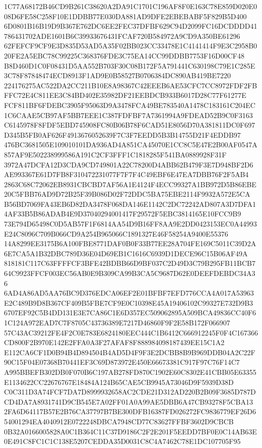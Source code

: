 \documentclass[UTF8,fontset=fandol,zihao=-4,a4paper]{ctexart}
\begin{document}
{{1C77A68172B46CD9B261C38620A2DA91C1701C196AF8F0E163C78E859D020E008D6FE58C258F10E1DDBB77E030DA881AD9DFE2EBEBABF5F829B5D400
6D0801B16B19D9B367E762DC6EE2FEC37DFBF629C94D2099FC16DCDDDD41786431702ADE1601B6C39933676431FCAF720B584972A9CD9A350BE61296
62FEFCF9CF9E3D835D53AD5A35F02BB023CC33478E1C4141414F9E3C2958B020FE2A5EBC78C99225C368376FDE3C75EA14CC99DDBB7753F16D00CF48
B8D460D1C0F08431D5AA552B703F30C08B172F5A791441C630198C79E1C285E3C78F87848474ECD8913F1AD9E0B58527B0706384DC890AB419BE7220
224176275AC522DA2CC211B10E8A98367C42EEEB6AE53CFC7CC8972FDF2FBFFC72E4C811EE3C84BD402E35982DF21EEBDCB933B6017D28C77F61277E
FCF811BF6FDEBC3905F95063D9A3478FCA49BE783540A1478C183161C204EC1C6CAAE5CB97AF5BB7EEE1C387FDFBF7A7361994A9FDEAD52B9C0F3163
C6145978F8FDF5EBD745908FC80B06B78F6CAD51E8056D70A381811DC0F697D345B5FB0AF626F4913676052639F7C3F7EEDD5B3B14755D21F4EDDB97
476BC3681505E109010101DA936AD4A851CA45070E1CC8C5E47E2B00AF0547A857AF9E502238999586A191C2CF3FFF1C1818285F541BA0889928F31F
3972A47DCFA12D3CDA9CD749801A22C78200D4ABB62B479F3E7D948BF2D6AE993367E61D7FB8F310472231077F7F7F4C49EBF6E47EA7DBB76F2F5AB4
2863C68C72062EB8931CBCBD7AF56A1E4124F4ECC99327A1BB972D5B86EBE20C5FBB76AD9D72B25F39B086D02F72DDC5BA75EBE2114F9932A572E5CA
B56BD7069FA43EB6D82DA3478F068DA146E1142C2DC72242AD807A3D7DFA14AF33B5B86ADAB4E9D37040294001417F29572F5EBC3814165E10FCC9B9
73E794D65498C0D5AB57F1F6814AA54D9B16FF8AA9E2DD0423153EC0A44993E24C8096C709B066CD9A254B965066C1891327E46F58254A9400E55376
14A8299EE3175B6A100FBE8771DAF0B0F33B77EE28A704FE169C5011C39D2A6E7CA5A1B32DBC789D36E04D69EB1C1616C6939D1DECE96C15B06AF49A
818181C117C63FFFFCF3BFE42BDBB66D9BF037C2D49D3C79B295FB11BCB764C9923FFCF003EC56AB0E9B309CA99B3CA5C9687D62E0DEEFDEBDC34A36
6AD4A86AD5AA76BC9D376EDCA06EF2E01BFBF7EFD776CCA4A017A53963E2C489B9D8B367CF409B5FBE7CF9E0C10398E45A19406102C99327E732D9B3
6707EF92C5B4DD131E3E7CA86C1E6D357EC509062895A509BCA49836CC40F61C124A972EAD7C7F8705C43736389E7217D46860F9F2E58B172F066907
57C43AC39212FE4F2C0E783E6824180EEC444C1B6412C666912245F0F4C167366CD800F2B970E142E2FFA0A3F27AFAF8F888984098187439EE15C1A2
E112CA6CF1D0B94B4D894504B4AD5D4F9F3E2DCBB8B9B969DDB04A2C22F90C15F04E07368B70441EF3C69D873972E450E66673381C917F97C76F14C7
A995BBEFB302DB0F070B6C197AB278FD870C1902E60C8302E41CBB05E63355E1134622CC22676767E18484A124B65CAE5CB9945A73046D9F5939D38D
C0C311D3A74FCF7DA7D8999932658AC2CDE21D312AD220B2B09F3685D787DCD4DA7A8931741D9CB545E7A02FF01A0A99AE5DBB6A47CB93278F5CBA13
2FA6D64117B57E2B76CA37797B7BE300DFB16387FD026272FC9836779EF26D654001294EA4040912E0722248DBCA7948CD77C83627FFBF3602D9CBCB
0B32A0166005828A0C1B364C11C37D9186C2F2E201F5EEDD7BF0E0C14AB63E0E491C8FC1C1C138E5207CEDDA35D0031C8C4A7462C78E1DC107705F95
}}
\end{document}
